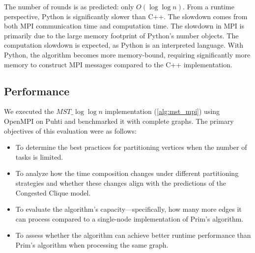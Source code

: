 \documentclass[english, 12pt, a4paper, elec, utf8, a-2b, online]{aaltothesis}
\newcommand{\mstalgo}{$MST\_\log\log{n}$}
\begin{document}
The number of rounds is as predicted: only $O(\log{\log{n}})$. From a runtime perspective, Python is significantly slower than C++. The slowdown comes from both MPI communication time and computation time. The slowdown in MPI is primarily due to the large memory footprint of Python's number objects. The computation slowdown is expected, as Python is an interpreted language. With Python, the algorithm becomes more memory-bound, requiring significantly more memory to construct MPI messages compared to the C++ implementation.

\subsection{Performance}
We executed the \mstalgo{} implementation (\cref{alg:mst_mpi}) using OpenMPI on Puhti and benchmarked it with complete graphs. The primary objectives of this evaluation were as follows:

\begin{itemize}
	\item To determine the best practices for partitioning vertices when the number of tasks is limited.
	\item To analyze how the time composition changes under different partitioning strategies and whether these changes align with the predictions of the Congested Clique model.
	\item To evaluate the algorithm's capacity—specifically, how many more edges it can process compared to a single-node implementation of Prim's algorithm.
	\item To assess whether the algorithm can achieve better runtime performance than Prim's algorithm when processing the same graph.
\end{itemize}
\end{document}
